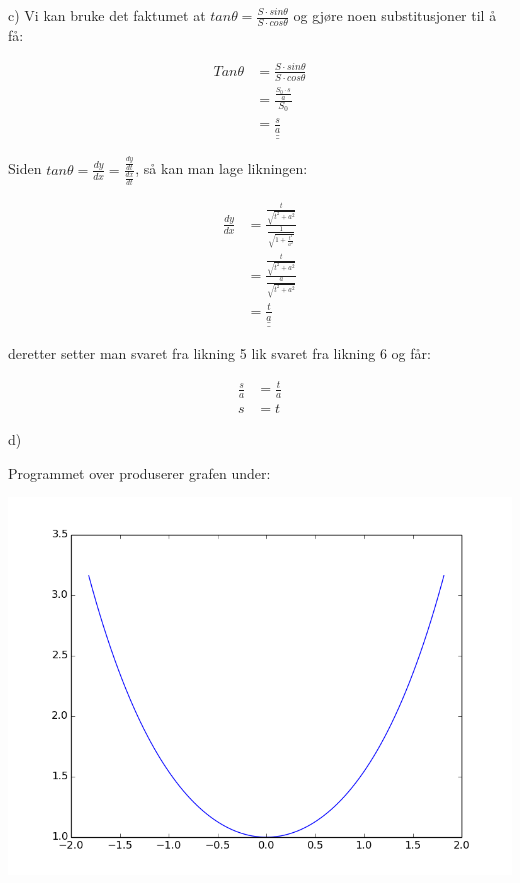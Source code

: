 \documentclass[12pt, a4paper]{article}
\begin{document}
\newpage

c) Vi kan bruke det faktumet at $tan \theta = \frac{S \cdot sin \theta}{S \cdot cos \theta}$ og gjøre noen substitusjoner til å få:

\begin{equation}
    \begin{split}
        Tan \theta &= \frac{S \cdot sin \theta}{S \cdot cos \theta} \\
                   &= \frac{\frac{S_0 \cdot s}{a}}{S_0} \\
                   &= \underline{\underline{\frac{s}{a}}}
    \end{split}
\end{equation}

Siden $tan \theta = \frac{dy}{dx} = \frac{\frac{dy}{dt}}{\frac{dx}{dt}}$, så kan man lage likningen:

\begin{equation}
    \begin{split}
        \frac{dy}{dx} &= \frac{\frac{t}{\sqrt{t^2 + a^2}}}{\frac{1}{\sqrt{1+\frac{t^2}{a^2}}}} \\
                      &= \frac{\frac{t}{\sqrt{t^2 + a^2}}}{\frac{a}{\sqrt{t^2 + a^2}}} \\
                      &= \underline{\underline{\frac{t}{a}}}
    \end{split}
\end{equation}

deretter setter man svaret fra likning 5 lik svaret fra likning 6 og får:

\begin{equation}
    \begin{split}
        \frac{s}{a} &= \frac{t}{a} \\
                  s &= t 
    \end{split}
\end{equation}

\newpage

d)


Programmet over produserer grafen under:

\includegraphics[scale=0.8]{1d}
\end{document}
